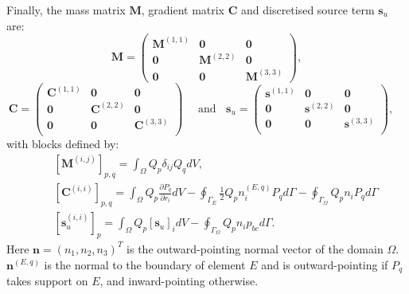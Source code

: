 \documentclass[preprint,authoryear,12pt]{elsarticle}
\begin{document}
Finally, the mass matrix ${\mathbf M}$, gradient matrix
${\mathbf C}$ and discretised source term ${\mathbf s}_{u}$ are:
\[\mathbf{M}=\left(
\begin{array}{ccc}
  \bm{M}^{(1,1)} &\bm{0} &\bm{0} \\
  \bm{0}   &\bm{M}^{(2,2)} &\bm{0} \\
  \bm{0} &\bm{0}  &\bm{M}^{(3,3)}   
\end{array}\right),\]
\[
\bm{C}=\left(
\begin{array}{ccc}
  \bm{C}^{(1,1)}&\bm{0}&\bm{0}\\
  \bm{0}&\bm{C}^{(2,2)}&\bm{0}\\
  \bm{0}&\bm{0}&\bm{C}^{(3,3)}\\
\end{array}\right)\quad \text{ and } \;\;
\bm{s}_u=\left(
\begin{array}{ccc}
  \bm{s}^{(1,1)}&\bm{0}&\bm{0}\\
  \bm{0}&\bm{s}^{(2,2)}&\bm{0}\\
  \bm{0}&\bm{0}&\bm{s}^{(3,3)}\\
\end{array}\right),\quad
\]
with blocks defined by:
\begin{eqnarray}
  && \left[{\mathbf M}^{(i,j)}\right]_{p,q} = \int_{\Omega}  Q_{p} \delta_{ij}
{Q}_{q}  dV, \\
  && {\left[\bm{C}^{(i,i)}\right]_{p,q} = \int_{\Omega} Q_{p} \frac{\partial P_{q}}{\partial r_i} dV - \oint_{\Gamma_{E}} \displaystyle\frac{1}{2} Q_{p} n_i^{(E,q)} P_{q} d\Gamma -  \oint_{\Gamma_{\Omega}} \displaystyle Q_{p} n_i P_{q} d\Gamma} \\
  && {\left[\bm{s}_{u}^{(i,i)}\right]_{p} = \int_{\Omega} Q_p} \left[{\mathbf s}_{u}\right]_i dV - \oint_{\Gamma_{\Omega}}\displaystyle Q_{p} n_i p_{bc} d\Gamma.
\end{eqnarray}
Here $\bm{n}=\left(n_{1},n_{2},n_{3}\right)^{T}$ is the outward-pointing normal vector of the domain $\Omega$. $\bm{n}^{(E,q)}$ is the normal to the boundary of element $E$ and is outward-pointing if $P_{q}$ takes support on $E$, and inward-pointing otherwise. 

\medskip
\end{document}
